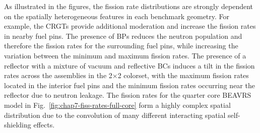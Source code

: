 As illustrated in the figures, the fission rate distributions are strongly dependent on the spatially heterogeneous features in each benchmark geometry. For example, the \acp{CRGT} provide additional moderation and increase the fission rates in nearby fuel pins. The presence of \acp{BP} reduces the neutron population and therefore the fission rates for the surrounding fuel pins, while increasing the variation between the minimum and maximum fission rates. The presence of a reflector with a mixture of vacuum and reflective \acp{BC} induces a tilt in the fission rates across the assemblies in the 2$\times$2 colorset, with the maximum fission rates located in the interior fuel pins and the minimum fission rates occurring near the reflector due to neutron leakage. The fission rates for the quarter core \ac{BEAVRS} model in Fig.~\ref{fig:chap7-fiss-rates-full-core} form a highly complex spatial distribution due to the convolution of many different interacting spatial self-shielding effects.

